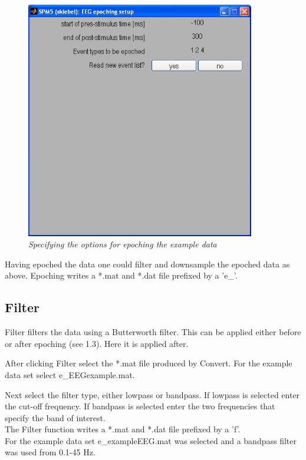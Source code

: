 \begin{figure}
\begin{center}
\includegraphics[width=100mm]{meeg/tutorial2}
\end{center}
\caption{\em Specifying the options for epoching the example data} 
\end{figure}

Having epoched the data one could filter and downsample the epoched data as above.
Epoching writes a *.mat and *.dat file prefixed by a 'e\_'. 

\subsection{Filter}
Filter filters the data using a Butterworth filter. This can be
applied either before or after epoching (see 1.3). Here it is applied
after. 

After clicking Filter select the *.mat file produced by Convert. For
the example data set select e\_EEGexample.mat. 

Next select the filter type, either lowpass or bandpass. If lowpass is
selected enter the cut-off frequency. If bandpass is selected enter
the two frequencies that specify the band of interest. \\ 

The Filter function writes a *.mat and *.dat file prefixed by a 'f'. \\

For the example data set e\_exampleEEG.mat was selected and a bandpass
filter was used from 0.1-45 Hz.


